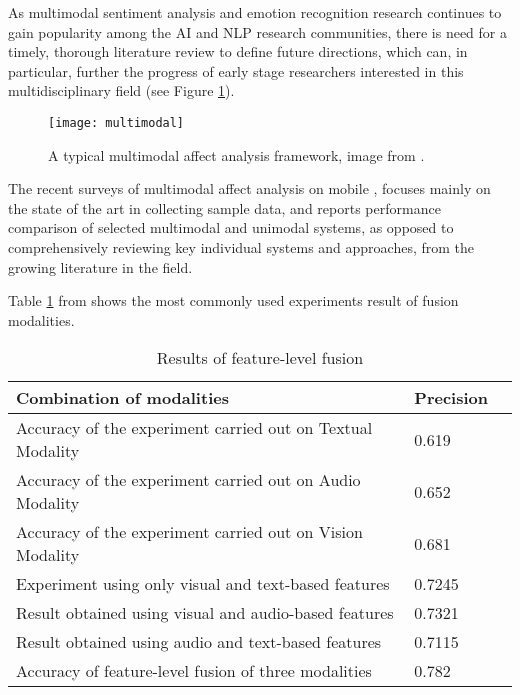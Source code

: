 As multimodal sentiment analysis and emotion recognition research continues to gain popularity among the AI and NLP research communities, there is need for a timely, thorough literature review to define future directions, which can, in particular, further the progress of early stage researchers interested in this multidisciplinary field (see Figure \ref{fig:multimodal}).

\begin{figure}
  \centering
  \texttt{[image: multimodal]}
  \caption{A typical multimodal affect analysis framework, image from \cite{Poria2017}.}
  \label{fig:multimodal}
\end{figure}

The recent surveys of multimodal affect analysis on mobile \cite{d2015review, poria2016fusing, Poria2017},
focuses mainly on the state of the art in collecting sample data, and reports performance comparison of selected multimodal and unimodal systems, as opposed to comprehensively reviewing key individual systems and approaches, from the growing literature in the field.

Table \ref{tab:feature-level} from \cite{d2015review} shows the most commonly used experiments result of fusion modalities.


\begin{table}
  \tiny
  \caption{Results of feature-level fusion}
  \label{tab:feature-level}
  \scriptsize
  \begin{center}
    \begin{tabular}{lll}
      Combination of modalities & Precision  \\
    \hline
    Accuracy of the experiment carried out on Textual Modality & 0.619   \\
    Accuracy of the experiment carried out on Audio Modality   & 0.652  \\
    Accuracy of the experiment carried out on Vision Modality   & 0.681  \\
    Experiment using only visual and text-based features       & 0.7245 \\
    Result obtained using visual and audio-based features      & 0.7321 \\
    Result obtained using audio and text-based features        & 0.7115 \\
    Accuracy of feature-level fusion of three modalities       & 0.782 
    \end{tabular}
  \end{center}
\end{table}

